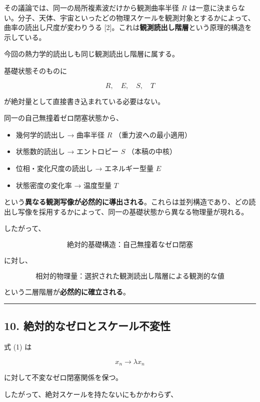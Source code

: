 \documentclass[
  a4paper,
]{ltjsarticle}
\providecommand{\tightlist}{%
  \setlength{\itemsep}{0pt}\setlength{\parskip}{0pt}}
\begin{document}
その議論では、同一の局所複素波だけから観測曲率半径 \(R\)
は一意に決まらない。分子、天体、宇宙といったどの物理スケールを観測対象とするかによって、曲率の読出し尺度が変わりうる
{[}2{]}。これは\textbf{観測読出し階層}という原理的構造を示している。

今回の熱力学的読出しも同じ観測読出し階層に属する。

基礎状態そのものに

\[
R,\quad E,\quad S,\quad T
\]

が絶対量として直接書き込まれている必要はない。

同一の自己無撞着ゼロ閉塞状態から、

\begin{itemize}
\tightlist
\item
  幾何学的読出し → 曲率半径 \(R\) （重力波への最小適用）
\item
  状態数的読出し → エントロピー \(S\) （本稿の中核）
\item
  位相・変化尺度の読出し → エネルギー型量 \(E\)
\item
  状態密度の変化率 → 温度型量 \(T\)
\end{itemize}

という\textbf{異なる観測写像が必然的に導出される}。これらは並列構造であり、どの読出し写像を採用するかによって、同一の基礎状態から異なる物理量が現れる。

したがって、

\[
\boxed{
\text{絶対的基礎構造：自己無撞着なゼロ閉塞}
}
\]

に対し、

\[
\boxed{
\text{相対的物理量：選択された観測読出し階層による観測的な値}
}
\]

という二層階層が\textbf{必然的に確立される}。

\begin{center}\rule{0.5\linewidth}{0.5pt}\end{center}

\subsection{10.
絶対的なゼロとスケール不変性}\label{ux7d76ux5bfeux7684ux306aux30bcux30edux3068ux30b9ux30b1ux30fcux30ebux4e0dux5909ux6027}

式 (1) は

\[
x_n\rightarrow\lambda x_n
\]

に対して不変なゼロ閉塞関係を保つ。

したがって、絶対スケールを持たないにもかかわらず、
\end{document}
